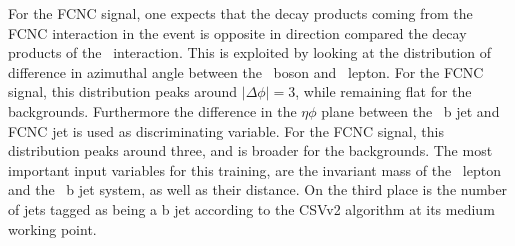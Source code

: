    
   For the FCNC signal, one expects that the decay products coming from the FCNC interaction in the event is opposite in direction compared the decay products of the \SM\ interaction. This is exploited by looking at the distribution of difference in azimuthal angle between the  \PZ\ boson and  \PW\ lepton. For the FCNC signal, this distribution peaks around $|\Delta\phi|=3$, while remaining flat for the backgrounds. Furthermore the difference in the $\eta\phi$ plane between the \SM\ b jet and FCNC jet is used as discriminating variable. For the FCNC signal, this distribution peaks around three, and is broader for the backgrounds.  The most important input variables for this training, are the invariant mass of the \PW\ lepton and the \SM\ b jet system, as well as their distance. On the third place is the number of jets tagged as being a b jet according to the CSVv2 algorithm at its medium working point. 
